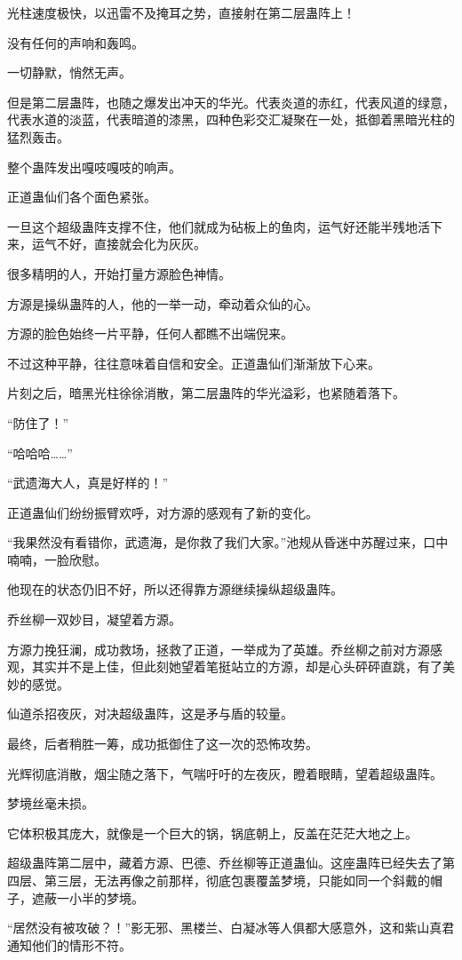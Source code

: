 \begin{this_body}
光柱速度极快，以迅雷不及掩耳之势，直接射在第二层蛊阵上！

没有任何的声响和轰鸣。

一切静默，悄然无声。

但是第二层蛊阵，也随之爆发出冲天的华光。代表炎道的赤红，代表风道的绿意，代表水道的淡蓝，代表暗道的漆黑，四种色彩交汇凝聚在一处，抵御着黑暗光柱的猛烈轰击。

整个蛊阵发出嘎吱嘎吱的响声。

正道蛊仙们各个面色紧张。

一旦这个超级蛊阵支撑不住，他们就成为砧板上的鱼肉，运气好还能半残地活下来，运气不好，直接就会化为灰灰。

很多精明的人，开始打量方源脸色神情。

方源是操纵蛊阵的人，他的一举一动，牵动着众仙的心。

方源的脸色始终一片平静，任何人都瞧不出端倪来。

不过这种平静，往往意味着自信和安全。正道蛊仙们渐渐放下心来。

片刻之后，暗黑光柱徐徐消散，第二层蛊阵的华光溢彩，也紧随着落下。

“防住了！”

“哈哈哈……”

“武遗海大人，真是好样的！”

正道蛊仙们纷纷振臂欢呼，对方源的感观有了新的变化。

“我果然没有看错你，武遗海，是你救了我们大家。”池规从昏迷中苏醒过来，口中喃喃，一脸欣慰。

他现在的状态仍旧不好，所以还得靠方源继续操纵超级蛊阵。

乔丝柳一双妙目，凝望着方源。

方源力挽狂澜，成功救场，拯救了正道，一举成为了英雄。乔丝柳之前对方源感观，其实并不是上佳，但此刻她望着笔挺站立的方源，却是心头砰砰直跳，有了美妙的感觉。

仙道杀招夜灰，对决超级蛊阵，这是矛与盾的较量。

最终，后者稍胜一筹，成功抵御住了这一次的恐怖攻势。

光辉彻底消散，烟尘随之落下，气喘吁吁的左夜灰，瞪着眼睛，望着超级蛊阵。

梦境丝毫未损。

它体积极其庞大，就像是一个巨大的锅，锅底朝上，反盖在茫茫大地之上。

超级蛊阵第二层中，藏着方源、巴德、乔丝柳等正道蛊仙。这座蛊阵已经失去了第四层、第三层，无法再像之前那样，彻底包裹覆盖梦境，只能如同一个斜戴的帽子，遮蔽一小半的梦境。

“居然没有被攻破？！”影无邪、黑楼兰、白凝冰等人俱都大感意外，这和紫山真君通知他们的情形不符。


\end{this_body}
